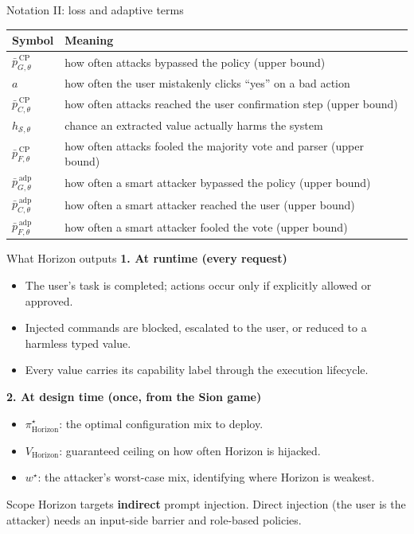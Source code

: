 \documentclass[aspectratio=169,11pt]{beamer}
\begin{document}
\begin{frame}{Notation II: loss and adaptive terms}
  \centering\small
  \begin{tabular}{@{}ll@{}}
    \toprule
    \textbf{Symbol} & \textbf{Meaning} \\
    \midrule
    $\bar p^{\,\mathrm{CP}}_{G,\theta}$ & how often attacks bypassed the policy (upper bound) \\
    $a$ & how often the user mistakenly clicks ``yes'' on a bad action \\
    $\bar p^{\,\mathrm{CP}}_{C,\theta}$ & how often attacks reached the user confirmation step (upper bound) \\
    $h_{\mathcal{S},\theta}$ & chance an extracted value actually harms the system \\
    $\bar p^{\,\mathrm{CP}}_{F,\theta}$ & how often attacks fooled the majority vote and parser (upper bound) \\
    $\bar p^{\,\mathrm{adp}}_{G,\theta}$ & how often a smart attacker bypassed the policy (upper bound) \\
    $\bar p^{\,\mathrm{adp}}_{C,\theta}$ & how often a smart attacker reached the user (upper bound) \\
    $\bar p^{\,\mathrm{adp}}_{F,\theta}$ & how often a smart attacker fooled the vote (upper bound) \\
    \bottomrule
  \end{tabular}
\end{frame}

\begin{frame}{What Horizon outputs}
  \small
  \textbf{1. At runtime (every request)}
  \begin{itemize}
    \item The user's task is completed; actions occur only if explicitly allowed or approved.
    \item Injected commands are blocked, escalated to the user, or reduced to a harmless typed value.
    \item Every value carries its capability label through the execution lifecycle.
  \end{itemize}
  \vspace{0.4em}
  \textbf{2. At design time (once, from the Sion game)}
  \begin{itemize}
    \item $\pi^\star_{\mathrm{Horizon}}$: the optimal configuration mix to deploy.
    \item $V_{\mathrm{Horizon}}$: guaranteed ceiling on how often Horizon is hijacked.
    \item $w^\star$: the attacker's worst-case mix, identifying where Horizon is weakest.
  \end{itemize}
  \begin{alertblock}{Scope}
    Horizon targets \textbf{indirect} prompt injection. Direct injection (the user is the attacker) needs an input-side barrier and role-based policies.
  \end{alertblock}
\end{frame}
\end{document}

